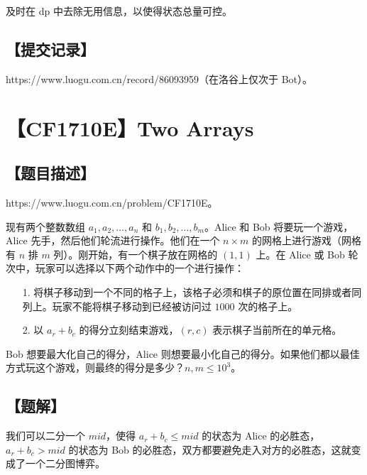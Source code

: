 \documentclass[UTF8,12pt,a4paper]{ctexart}
\begin{document}
	及时在 dp 中去除无用信息，以使得状态总量可控。
	
	\subsection*{【提交记录】}
	
	https://www.luogu.com.cn/record/86093959（在洛谷上仅次于 Bot）。
	
	
	\section*{【CF1710E】Two Arrays}
	
	\subsection*{【题目描述】}
	
	https://www.luogu.com.cn/problem/CF1710E。
	
	现有两个整数数组 $a_1, a_2, \dots, a_n$ 和 $b_1, b_2, \dots, b_m$。Alice 和 Bob 将要玩一个游戏，Alice 先手，然后他们轮流进行操作。他们在一个 $n\times m$ 的网格上进行游戏（网格有 $n$ 排 $m$ 列）。刚开始，有一个棋子放在网格的 $(1, 1)$ 上。在 Alice 或 Bob 轮次中，玩家可以选择以下两个动作中的一个进行操作：
	
	\begin{itemize}
		\item[1.] 将棋子移动到一个不同的格子上，该格子必须和棋子的原位置在同排或者同列上。玩家不能将棋子移动到已经被访问过 $1000$ 次的格子上。
		\item[2.] 以 $a_r + b_c$ 的得分立刻结束游戏，$(r, c)$ 表示棋子当前所在的单元格。
	\end{itemize}
	
	Bob 想要最大化自己的得分，Alice 则想要最小化自己的得分。如果他们都以最佳方式玩这个游戏，则最终的得分是多少？$n,m\le 10^3$。
	
	\subsection*{【题解】}
	
	我们可以二分一个 $mid$，使得 $a_r+b_c\le mid$ 的状态为 Alice 的必胜态，$a_r+b_c>mid$ 的状态为 Bob 的必胜态，双方都要避免走入对方的必胜态，这就变成了一个二分图博弈。
	
\end{document}
